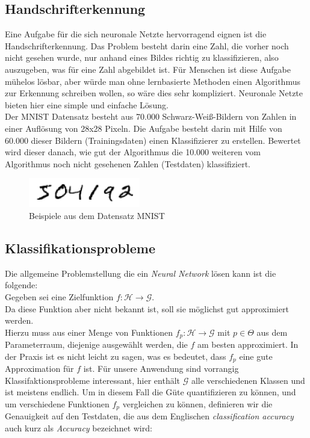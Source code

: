 \documentclass[]{scrartcl}
\begin{document}
	\subsection{Handschrifterkennung}\label{mnist}

		Eine Aufgabe für die sich neuronale Netzte hervorragend eignen ist die Handschrifterkennung.
		Das Problem besteht darin eine Zahl, die vorher noch nicht gesehen wurde, nur anhand eines Bildes richtig zu klassifizieren, also auszugeben, was für eine Zahl abgebildet ist.
		Für Menschen ist diese Aufgabe mühelos lösbar, aber würde man ohne lernbasierte Methoden einen Algorithmus zur Erkennung schreiben wollen, so wäre dies sehr kompliziert.
		Neuronale Netzte bieten hier eine simple und einfache Lösung.\\

		Der MNIST Datensatz \cite{mnist_data} besteht aus 70.000 Schwarz-Weiß-Bildern von Zahlen in einer Auflösung von 28x28 Pixeln.
		Die Aufgabe besteht darin mit Hilfe von 60.000 dieser Bildern (Trainingsdaten) einen Klassifizierer zu erstellen.
		Bewertet wird dieser danach, wie gut der Algorithmus die 10.000 weiteren vom Algorithmus noch nicht gesehenen Zahlen (Testdaten) klassifiziert.

		\begin{figure}[h]
			\centering
			\includegraphics[scale=0.7]{img/mnist_example.png}
			\caption{Beispiele aus dem Datensatz MNIST \cite{mnist_data}}
			\label{fig:mnist}
		\end{figure}

	\subsection{Klassifikationsprobleme}

		Die allgemeine Problemstellung die ein \textit{Neural Network} lösen kann ist die folgende:\\
		Gegeben sei eine Zielfunktion $f:\mathcal{H} \to \mathcal{G}$.\\
		Da diese Funktion aber nicht bekannt ist, soll sie möglichst gut approximiert werden. \\
		Hierzu muss aus einer Menge von Funktionen $f_p:\mathcal{H} \to \mathcal{G}$ mit $p \in \Theta$ aus dem Parameterraum, diejenige ausgewählt werden, die $f$ am besten approximiert.
		In der Praxis ist es nicht leicht zu sagen, was es bedeutet, dass $f_p$ eine gute Approximation für $f$ ist.
		Für unsere Anwendung sind vorrangig Klassifaktionsprobleme interessant, hier enthält $\mathcal{G}$ alle verschiedenen Klassen und ist meistens endlich.
		Um in diesem Fall die Güte quantifizieren zu können, und um verschiedene Funktionen $f_p$ vergleichen zu können, definieren wir die Genauigkeit auf den Testdaten,
		die aus dem Englischen \textit{classification accuracy} auch kurz als \textit{Accuracy} bezeichnet wird:
\end{document}
